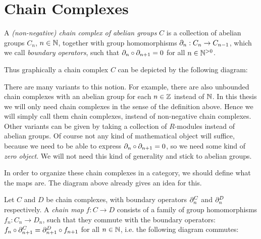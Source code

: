 \section{Chain Complexes}
\label{sec:Chain Complexes}
\begin{definition}
	A \emph{(non-negative) chain complex of abelian groups} $C$ is a collection of abelian groups $C_n$, $n \in \mathbb{N}$, together with group homomorphisms $\partial_n: C_n \to C_{n-1}$, which we call \emph{boundary operators}, such that $\partial_n \circ \partial_{n+1} = 0$ for all $n \in {\mathbb{N}^{>0}}$.
\end{definition}

Thus graphically a chain complex $C$ can be depicted by the following diagram:
\begin{center}
\end{center}

There are many variants to this notion. For example, there are also unbounded chain complexes with an abelian group for each $n \in \mathbb{Z}$ instead of $\mathbb{N}$. In this thesis we will only need chain complexes in the sense of the definition above. Hence we will simply call them chain complexes, instead of non-negative chain complexes. Other variants can be given by taking a collection of $R$-modules instead of abelian groups. Of course not any kind of mathematical object will suffice, because we need to be able to express $\partial_n \circ \partial_{n+1} = 0$, so we need some kind of \emph{zero object}. We will not need this kind of generality and stick to abelian groups.

In order to organize these chain complexes in a category, we should define what the maps are. The diagram above already gives an idea for this.
\begin{definition}
	Let $C$ and $D$ be chain complexes, with boundary operators $\partial^C_n$ and $\partial^D_n$ respectively. A \emph{chain map} $f: C \to D$ consists of a family of group homomorphisms $f_n: C_n \to D_n$, such that they commute with the boundary operators: $f_n \circ \partial^C_{n+1} = \partial^D_{n+1} \circ f_{n+1}$ for all $n \in \mathbb{N}$, i.e. the following diagram commutes:
	\begin{center}
	\end{center}
\end{definition}

